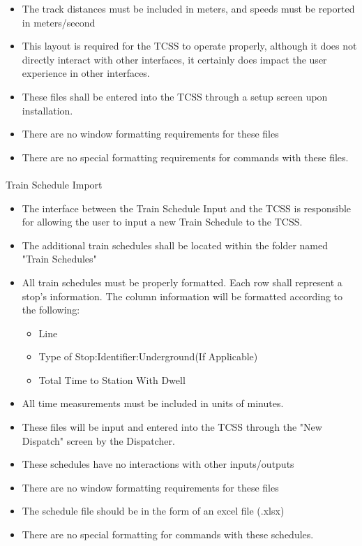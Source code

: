 \documentclass{article}
\begin{document}
\begin{itemize}
\begin{itemize}
\begin{itemize}
            \end{itemize}
        \end{itemize}
        \item The track distances must be included in meters, and speeds must be reported in meters/second
        \item This layout is required for the TCSS to operate properly, although it does not directly interact with other interfaces, it certainly does impact the user experience in other interfaces.
        \item These files shall be entered into the TCSS through a setup screen upon installation.
        \item There are no window formatting requirements for these files
        \item There are no special formatting requirements for commands with these files.
    \end{itemize}
    
    \paragraph{}
    Train Schedule Import
    \begin{itemize}
        \item The interface  between the Train Schedule Input and the TCSS is responsible for allowing the user to input a new Train Schedule to the TCSS.
        \item The additional train schedules shall be located within the folder named "Train Schedules"
        \item All train schedules must be properly formatted. Each row shall represent a stop's information. The column information will be formatted according to the following:
        \begin{itemize}
        \item Line
        \item Type of Stop:Identifier:Underground(If Applicable)
        \item Total Time to Station With Dwell
        \end{itemize}
        \item All time measurements must be included in units of minutes.
        \item These files will be input and entered into the TCSS through the "New Dispatch" screen by the Dispatcher.
        \item These schedules have no interactions with other inputs/outputs
        \item There are no window formatting requirements for these files
        \item The schedule file should be in the form of an excel file (.xlsx)
        \item There are no special formatting for commands with these schedules. 
    \end{itemize}
    
\end{document}
